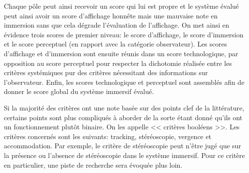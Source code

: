 	\par Chaque pôle peut ainsi recevoir un score qui lui est propre et le système évalué peut ainsi avoir un score d'affichage honnête mais une mauvaise note en immersion sans que cela dégrade l'évaluation de l'affichage. On met ainsi en évidence trois scores de premier niveau: le score d'affichage, le score d'immersion et le score perceptuel (en rapport avec la catégorie observateur). Les scores d'affichage et d'immersion sont ensuite réunis dans un score technologique, par opposition au score perceptuel pour respecter la dichotomie réalisée entre les critères systémiques pur des critères nécessitant des informations sur l'observateur. Enfin, les scores technologique et perceptuel sont assemblés afin de donner le score global du système immersif évalué.
	
	\par Si la majorité des critères ont une note basée sur des points clef de la littérature, certains points sont plus compliqués à aborder de la sorte étant donné qu'ils ont un fonctionnement plutôt binaire. On les appelle << critères booléens >>. Les critères concernés sont les suivants: tracking, stéréoscopie, vergence et accommodation. Par exemple, le critère de stéréoscopie peut n'être jugé que sur la présence ou l'absence de stéréoscopie dans le système immersif. Pour ce critère en particulier, une piste de recherche sera évoquée plus loin.
	
